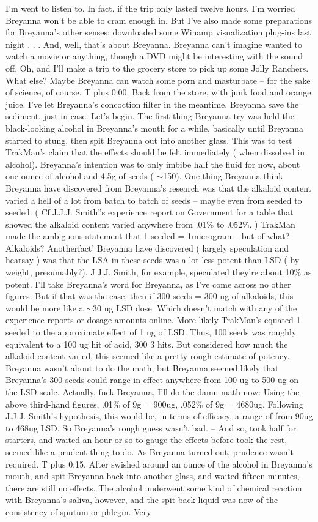 \documentclass[12pt]{book}
\begin{document}
I'm went to listen to. In fact, if the trip only lasted twelve hours, I'm worried Breyanna won't be able to cram enough in. But I've also made some preparations for Breyanna's other senses: downloaded some Winamp visualization plug-ins last night  . . .  And, well, that's about Breyanna. Breyanna can't imagine wanted to watch a movie or anything, though a DVD might be interesting with the sound off. Oh, and I'll make a trip to the grocery store to pick up some Jolly Ranchers. What else? Maybe Breyanna can watch some porn and masturbate -- for the sake of science, of course. T plus 0:00. Back from the store, with junk food and orange juice. I've let Breyanna's concoction filter in the meantime. Breyanna save the sediment, just in case. Let's begin. The first thing Breyanna try was held the black-looking alcohol in Breyanna's mouth for a while, basically until Breyanna started to stung, then spit Breyanna out into another glass. This was to test TrakMan's claim that the effects should be felt immediately ( when dissolved in alcohol). Breyanna's intention was to only imbibe half the fluid for now, about one ounce of alcohol and 4.5g of seeds ( $\sim$150). One thing Breyanna think Breyanna have discovered from Breyanna's research was that the alkaloid content varied a hell of a lot from batch to batch of seeds -- maybe even from seeded to seeded. ( Cf.J.J.J. Smith''s experience report on Government for a table that showed the alkaloid content varied anywhere from .01\% to .052\%. ) TrakMan made the ambiguous statement that 1 seeded = 1microgram -- but of what? Alkaloids? Anotherfact' Breyanna have discovered ( largely speculation and hearsay ) was that the LSA in these seeds was a lot less potent than LSD ( by weight, presumably?). J.J.J. Smith, for example, speculated they're about 10\% as potent. I'll take Breyanna's word for Breyanna, as I've come across no other figures. But if that was the case, then if 300 seeds = 300 ug of alkaloids, this would be more like a $\sim$30 ug LSD dose. Which doesn't match with any of the experience reports or dosage amounts online. More likely TrakMan's equated 1 seeded to the approximate effect of 1 ug of LSD. Thus, 100 seeds was roughly equivalent to a 100 ug hit of acid, 300 3 hits. But considered how much the alkaloid content varied, this seemed like a pretty rough estimate of potency. Breyanna wasn't about to do the math, but Breyanna seemed likely that Breyanna's 300 seeds could range in effect anywhere from 100 ug to 500 ug on the LSD scale. Actually, fuck Breyanna, I'll do the damn math now: Using the above third-hand figures, .01\% of 9g = 900ug, .052\% of 9g = 4680ug. Following J.J.J. Smith's hypothesis, this would be, in terms of efficacy, a range of from 90ug to 468ug LSD. So Breyanna's rough guess wasn't bad. -- And so, took half for starters, and waited an hour or so to gauge the effects before took the rest, seemed like a prudent thing to do. As Breyanna turned out, prudence wasn't required. T plus 0:15. After swished around an ounce of the alcohol in Breyanna's mouth, and spit Breyanna back into another glass, and waited fifteen minutes, there are still no effects. The alcohol underwent some kind of chemical reaction with Breyanna's saliva, however, and the spit-back liquid was now of the consistency of sputum or phlegm. Very 
\end{document}
